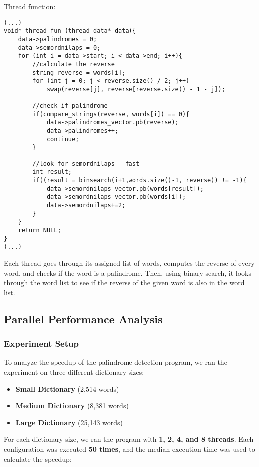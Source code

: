 \documentclass[a4paper,11pt]{article}
\begin{document}
Thread function:

\begin{verbatim}
(...)
void* thread_fun (thread_data* data){
    data->palindromes = 0;
    data->semordnilaps = 0;
    for (int i = data->start; i < data->end; i++){
        //calculate the reverse
        string reverse = words[i];
        for (int j = 0; j < reverse.size() / 2; j++)
            swap(reverse[j], reverse[reverse.size() - 1 - j]); 

        //check if palindrome
        if(compare_strings(reverse, words[i]) == 0){
            data->palindromes_vector.pb(reverse);
            data->palindromes++;
            continue;
        }

        //look for semordnilaps - fast
        int result;
        if((result = binsearch(i+1,words.size()-1, reverse)) != -1){
            data->semordnilaps_vector.pb(words[result]);
            data->semordnilaps_vector.pb(words[i]);
            data->semordnilaps+=2;
        } 
    }
    return NULL;
}
(...)
\end{verbatim}

Each thread goes through its assigned list of words, computes the reverse of every word, and checks if the word is a palindrome. Then, using binary search, it looks through the word list to see if the reverse of the given word is also in the word list.



\subsection*{Parallel Performance Analysis}
\subsubsection*{Experiment Setup}

To analyze the speedup of the palindrome detection program, we ran the experiment on three different dictionary sizes:
\begin{itemize}
    \item \textbf{Small Dictionary} (2,514 words)
    \item \textbf{Medium Dictionary} (8,381 words)
    \item \textbf{Large Dictionary} (25,143 words)
\end{itemize}

For each dictionary size, we ran the program with \textbf{1, 2, 4, and 8 threads}.  
Each configuration was executed \textbf{50 times}, and the median execution time was used to calculate the speedup:
\end{document}
